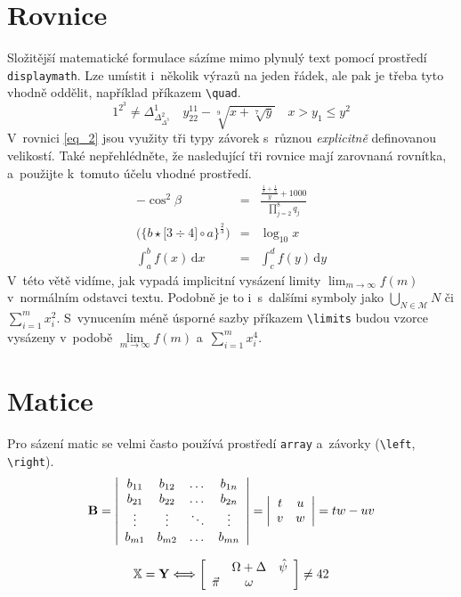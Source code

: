 \documentclass[11pt, twocolumn, a4paper]{article}
\begin{document}
\section{Rovnice}
Složitější matematické formulace sázíme mimo plynulý text pomocí prostředí \verb|displaymath|.
Lze umístit i~několik výrazů na jeden řádek, ale pak je třeba tyto vhodně oddělit,
například příkazem \verb|\quad|.
$$
1^{2^3} \neq \Delta^1_{\Delta^2_{\Delta^3}}
\quad
y^{11}_{22} - \sqrt[9]{x+\sqrt[7]{y}}
\quad
x > y_1 \leq y^2
$$
V~rovnici \eqref{eq_2} jsou využity tři typy závorek s~různou \emph{explicitně}
definovanou velikostí. Také nepřehlédněte, že nasledující tři rovnice mají zarovnaná
rovnítka, a~použijte k~tomuto účelu vhodné prostředí.
\begin{eqnarray}
	\label{eq_1} -\cos^2 \beta & = & \frac{\frac{\frac{1}{x}+\frac{1}{3}}{y}+1000}{\prod\limits _{j=2}^8 q_j} \\
	\label{eq_2} \bigg( \Big\{ b \star \big[ 3 \div 4 \big] \circ a \Big\}^\frac{2}{3}\bigg) & = & \log_{10}x \\
	\label{eq_3} \int_a^b f(x)\,\mathrm{d}x & = & \int_c^d f(y)\,\mathrm{d}y
\end{eqnarray}
V~této větě vidíme, jak vypadá implicitní vysázení limity $\lim_{m \to \infty} f(m)$ v~normálním
odstavci textu. Podobně je to i~s~dalšími symboly jako $\bigcup_{N \in \mathcal{M}} N$ či 
$\sum_{i=1}^{m} x_i^2$. S~vynucením méně úsporné sazby příkazem \verb|\limits|
budou vzorce vysázeny v~podobě $\lim\limits_{m \to \infty} f(m)$
a~$\sum\limits_{i=1}^{m} x_i^4$.

\section{Matice}
Pro sázení matic se velmi často používá prostředí \verb|array| a~závorky (\verb|\left|, \verb|\right|).
$$
\mathbf{B} =
\left|
\begin{array}{c c c c}
	b_{11} & b_{12} & \dots  & b_{1n} \\
	b_{21} & b_{22} & \dots  & b_{2n} \\
	\vdots & \vdots & \ddots & \vdots \\
	b_{m1} & b_{m2} & \dots  & b_{mn} 
\end{array}
\right|
=
\left|
\begin{array}{c c}
	t & u \\
	v & w 
\end{array}
\right|
= tw - uv
$$

$$
\mathbb{X}=\mathbf{Y}\Longleftrightarrow\bigg[
	\begin{array}{c c c}
		\phantom{} & \Omega+\Delta & \hat{\psi} \\
		\vec{\pi}  & \omega        & \phantom{} \\
	\end{array}
\bigg]
\neq 42
$$
\end{document}

